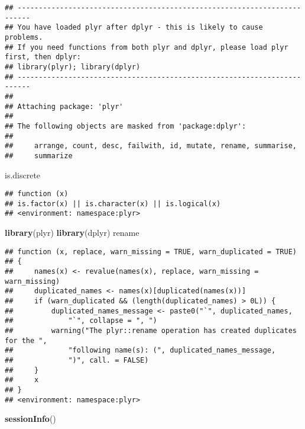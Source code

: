 \documentclass[]{article}
\newenvironment{Shaded}{\begin{snugshade}}{\end{snugshade}}
\newcommand{\KeywordTok}[1]{\textcolor[rgb]{0.13,0.29,0.53}{\textbf{{#1}}}}
\newcommand{\NormalTok}[1]{{#1}}
\begin{document}
\begin{verbatim}
## -------------------------------------------------------------------------
## You have loaded plyr after dplyr - this is likely to cause problems.
## If you need functions from both plyr and dplyr, please load plyr first, then dplyr:
## library(plyr); library(dplyr)
## -------------------------------------------------------------------------
## 
## Attaching package: 'plyr'
## 
## The following objects are masked from 'package:dplyr':
## 
##     arrange, count, desc, failwith, id, mutate, rename, summarise,
##     summarize
\end{verbatim}

\begin{Shaded}
\begin{Highlighting}[]
\NormalTok{is.discrete}
\end{Highlighting}
\end{Shaded}

\begin{verbatim}
## function (x) 
## is.factor(x) || is.character(x) || is.logical(x)
## <environment: namespace:plyr>
\end{verbatim}

\begin{Shaded}
\begin{Highlighting}[]
\KeywordTok{library}\NormalTok{(plyr)}
\KeywordTok{library}\NormalTok{(dplyr)}
\NormalTok{rename}
\end{Highlighting}
\end{Shaded}

\begin{verbatim}
## function (x, replace, warn_missing = TRUE, warn_duplicated = TRUE) 
## {
##     names(x) <- revalue(names(x), replace, warn_missing = warn_missing)
##     duplicated_names <- names(x)[duplicated(names(x))]
##     if (warn_duplicated && (length(duplicated_names) > 0L)) {
##         duplicated_names_message <- paste0("`", duplicated_names, 
##             "`", collapse = ", ")
##         warning("The plyr::rename operation has created duplicates for the ", 
##             "following name(s): (", duplicated_names_message, 
##             ")", call. = FALSE)
##     }
##     x
## }
## <environment: namespace:plyr>
\end{verbatim}

\printbibliography

\begin{Shaded}
\begin{Highlighting}[]
\KeywordTok{sessionInfo}\NormalTok{()}
\end{Highlighting}
\end{Shaded}
\end{document}
